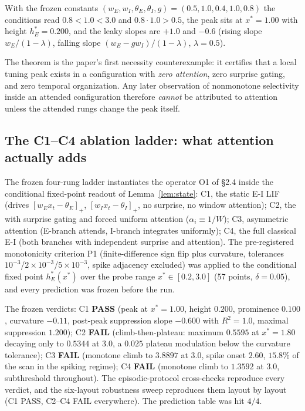 With the frozen constants $(w_E,w_I,\theta_E,\theta_I,g)=
(0.5,1.0,0.4,1.0,0.8)$ the conditions read
$0.8<1.0<3.0$ and $0.8\cdot1.0>0.5$, the peak sits at $x^*=1.00$ with
height $h_E^*=0.200$, and the leaky slopes are $+1.0$ and $-0.6$
(rising slope $w_E/(1-\lambda)$, falling slope
$(w_E-g w_I)/(1-\lambda)$, $\lambda=0.5$).

\begin{remark}
The theorem is the paper's first necessity counterexample: it certifies
that a local tuning peak exists in a configuration with \emph{zero
attention}, zero surprise gating, and zero temporal organization. Any
later observation of nonmonotone selectivity inside an attended
configuration therefore \emph{cannot} be attributed to attention unless
the attended rungs change the peak itself.
\end{remark}

\subsection{The C1--C4 ablation ladder: what attention actually adds}
\label{sec:ladder41}

The frozen four-rung ladder instantiates the operator O1 of §2.4 inside
the conditional fixed-point readout of Lemma~\ref{lem:state}: C1, the
static E-I LIF (drives $[w_E x_t-\theta_E]_+$, $[w_I x_t-\theta_I]_+$, no
surprise, no window attention); C2, the \TAN{} with surprise gating and
forced uniform attention ($\alpha_i\equiv1/W$); C3, asymmetric attention
(E-branch attends, I-branch integrates uniformly); C4, the full classical
E-I \TAN{} (both branches with independent surprise and attention). The
pre-registered monotonicity criterion P1 (finite-difference sign flip plus
curvature, tolerances $10^{-3}$/$2\times10^{-3}$/$5\times10^{-3}$, spike
adjacency excluded) was applied to the conditional fixed point
$h_E^*(x^*)$ over the probe range $x^*\in[0.2,3.0]$ (57 points,
$\delta=0.05$), and every prediction was frozen before the run.

The frozen verdicts: C1 \textbf{PASS} (peak at $x^*=1.00$, height
$0.200$, prominence $0.100$, curvature $-0.11$, post-peak suppression slope
$-0.600$ with $R^2=1.0$, maximal suppression $1.200$); C2 \textbf{FAIL}
(climb-then-plateau: maximum $0.5595$ at $x^*=1.80$ decaying only to
$0.5344$ at $3.0$, a $0.025$ plateau modulation below the curvature
tolerance); C3 \textbf{FAIL} (monotone climb to $3.8897$ at $3.0$, spike
onset $2.60$, $15.8\%$ of the scan in the spiking regime); C4
\textbf{FAIL} (monotone climb to $1.3592$ at $3.0$, subthreshold
throughout). The episodic-protocol cross-checks reproduce every verdict,
and the six-layout robustness sweep reproduces them layout by layout
(C1 PASS, C2--C4 FAIL everywhere). The prediction table was hit $4/4$.

